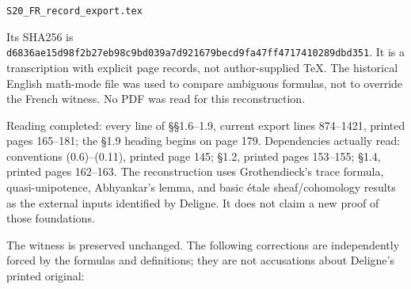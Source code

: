 \documentclass[
]{report}
\begin{document}
\texttt{S20\_FR\_record\_export.tex}

Its SHA256 is
\nolinkurl{d6836ae15d98f2b27eb98c9bd039a7d921679becd9fa47ff4717410289dbd351}.
It is a transcription with explicit page records, not author-supplied
TeX. The historical English math-mode file was used to compare ambiguous
formulas, not to override the French witness. No PDF was read for this
reconstruction.

Reading completed: every line of §§1.6--1.9, current export lines
874--1421, printed pages 165--181; the §1.9 heading begins on page 179.
Dependencies actually read: conventions (0.6)--(0.11), printed page 145;
§1.2, printed pages 153--155; §1.4, printed pages 162--163. The
reconstruction uses Grothendieck's trace formula, quasi-unipotence,
Abhyankar's lemma, and basic étale sheaf/cohomology results as the
external inputs identified by Deligne. It does not claim a new proof of
those foundations.

The witness is preserved unchanged. The following corrections are
independently forced by the formulas and definitions; they are not
accusations about Deligne's printed original:
\end{document}
